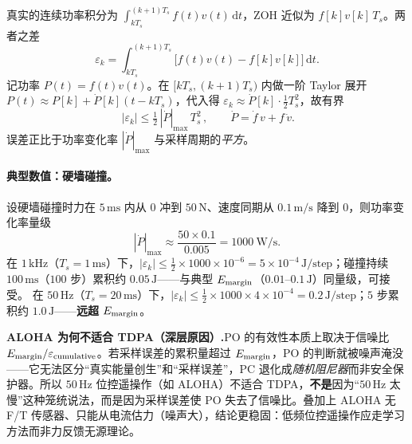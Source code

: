\begin{derivation}[PO 的局部截断误差]
真实的连续功率积分为 $\int_{kT_s}^{(k+1)T_s} f(t)v(t)\,\mathrm dt$，ZOH 近似为 $f[k]v[k]\,T_s$。两者之差
\begin{equation}
  \varepsilon_k=\int_{kT_s}^{(k+1)T_s}\!\big[f(t)v(t)-f[k]v[k]\big]\,\mathrm dt .
  \label{eq:tdpa-trunc}
\end{equation}
记功率 $P(t)=f(t)v(t)$。在 $[kT_s,(k{+}1)T_s)$ 内做一阶 Taylor 展开 $P(t)\approx P[k]+\dot P[k](t-kT_s)$，代入得 $\varepsilon_k\approx\dot P[k]\cdot\tfrac12 T_s^2$，故有界
\begin{equation}
  \boxed{\,|\varepsilon_k|\le\tfrac12\,|\dot P|_{\max}\,T_s^2\,},\qquad \dot P=\dot f\,v+f\,\dot v .
  \label{eq:tdpa-trunc-bound}
\end{equation}
误差正比于功率变化率 $|\dot P|_{\max}$ 与采样周期的\emph{平方}。
\end{derivation}

\paragraph{典型数值：硬墙碰撞。}
设硬墙碰撞时力在 $5\,\mathrm{ms}$ 内从 $0$ 冲到 $50\,\mathrm{N}$、速度同期从 $0.1\,\mathrm{m/s}$ 降到 $0$，则功率变化率量级
\begin{equation}
  |\dot P|_{\max}\approx\frac{50\times0.1}{0.005}=1000\ \mathrm{W/s}.
  \label{eq:tdpa-Pdot-example}
\end{equation}
在 $1\,\mathrm{kHz}$（$T_s=1\,\mathrm{ms}$）下，$|\varepsilon_k|\le\tfrac12\times1000\times10^{-6}=5\times10^{-4}\,\mathrm{J/step}$；碰撞持续 $100\,\mathrm{ms}$（$100$ 步）累积约 $0.05\,\mathrm J$——与典型 $E_{\rm margin}$（$0.01$–$0.1\,\mathrm J$）同量级，可接受。
在 $50\,\mathrm{Hz}$（$T_s=20\,\mathrm{ms}$）下，$|\varepsilon_k|\le\tfrac12\times1000\times4\times10^{-4}=0.2\,\mathrm{J/step}$；$5$ 步累积约 $1.0\,\mathrm J$——\textbf{远超} $E_{\rm margin}$。

\begin{insight}
\textbf{ALOHA 为何不适合 TDPA（深层原因）.}\;PO 的有效性本质上取决于信噪比 $E_{\rm margin}/\varepsilon_{\rm cumulative}$。若采样误差的累积量超过 $E_{\rm margin}$，PO 的判断就被噪声淹没——它无法区分“真实能量创生”和“采样误差”，PC 退化成\emph{随机阻尼器}而非安全保护器。所以 $50\,\mathrm{Hz}$ 位控遥操作（如 ALOHA）不适合 TDPA，\textbf{不是}因为“$50\,\mathrm{Hz}$ 太慢”这种笼统说法，而是因为采样误差使 PO 失去了信噪比。叠加上 ALOHA 无 F/T 传感器、只能从电流估力（噪声大），结论更稳固：低频位控遥操作应走学习方法而非力反馈无源理论。
\end{insight}

